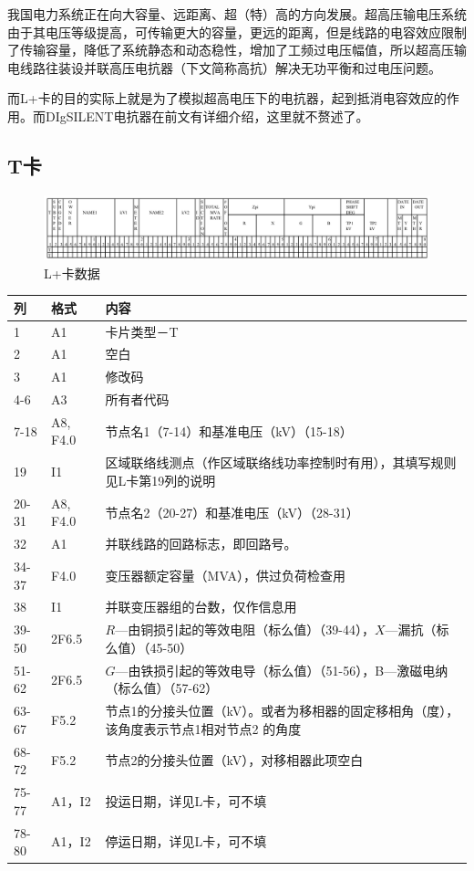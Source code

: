 我国电力系统正在向大容量、远距离、超（特）高的方向发展。超高压输电压系统由于其电压等级提高，可传输更大的容量，更远的距离，但是线路的电容效应限制了传输容量，降低了系统静态和动态稳性，增加了工频过电压幅值，所以超高压输电线路往装设并联高压电抗器（下文简称高抗）解决无功平衡和过电压问题。

而L+卡的目的实际上就是为了模拟超高电压下的电抗器，起到抵消电容效应的作用。而DIgSILENT电抗器在前文有详细介绍，这里就不赘述了。

\subsection{T卡}

\begin{figure}[H]
\centering
\includegraphics[width=1.05\textwidth]{images/Paper_Fig_46.png}
\setcaptionwidth{\linewidth}
\caption{L+卡数据}
\end{figure}

\begin{spacing}{1.0}
\begin{longtable}[h]{llp{}}
\toprule
列 & 格式 & 内容\\
 \midrule
1 & A1 & 卡片类型－T\\
2 & A1 & 空白\\ 
3 & A1 & 修改码 \\
4-6 & A3 & 所有者代码 \\
7-18 & A8, F4.0 & 节点名1（7-14）和基准电压（kV）（15-18） \\
19 & I1 & 区域联络线测点（作区域联络线功率控制时有用），其填写规则见L卡第19列的说明 \\
20-31& A8, F4.0 & 节点名2（20-27）和基准电压（kV）（28-31）\\ 
32 & A1 & 并联线路的回路标志，即回路号。 \\
34-37	& F4.0 & 变压器额定容量（MVA），供过负荷检查用 \\
38	 	 &I1 & 并联变压器组的台数，仅作信息用 \\
39-50 	 &2F6.5& $R$—由铜损引起的等效电阻（标么值）（39-44），$X$—漏抗（标么值）（45-50） \\
51-62	 &2F6.5 &$G$—由铁损引起的等效电导（标么值）（51-56），B—激磁电纳（标么值）（57-62） \\
63-67	 &F5.2  &节点1的分接头位置（kV）。或者为移相器的固定移相角（度），该角度表示节点1相对节点2 的角度 \\
68-72	& F5.2  &节点2的分接头位置（kV），对移相器此项空白 \\
75-77	& A1，I2&  投运日期，详见L卡，可不填 \\
78-80 	& A1，I2  &停运日期，详见L卡，可不填\\
\bottomrule
\end{longtable}
\end{spacing}

